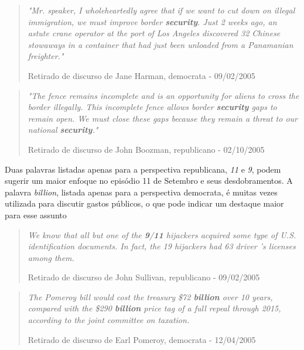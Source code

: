 \begin{quote}
\emph{"Mr. speaker, I wholeheartedly agree that if we want to cut down on illegal immigration, we must improve border \textbf{security}. Just 2 weeks ago, an astute crane operator at the port of Los Angeles discovered 32 Chinese stowaways in a container that had just been unloaded from a Panamanian freighter."} 

{\small Retirado de discurso de Jane Harman, democrata - 09/02/2005 }

\end{quote}

\begin{quote}
\emph{"The fence remains incomplete and is an opportunity for aliens to cross the border illegally. This incomplete fence allows border \textbf{security} gaps to remain open.  We must close these gaps because they remain a threat to our national \textbf{security}."}

{\small Retirado de discurso de John Boozman, republicano - 02/10/2005}

\end{quote}

Duas palavras listadas apenas para a perspectiva republicana, \emph{11} e \emph{9}, podem sugerir um maior enfoque no episódio 11 de Setembro e seus desdobramentos. A palavra \emph{billion}, listada apenas para a perspectiva democrata, é muitas vezes utilizada para discutir gastos públicos, o que pode indicar um destaque maior para esse assunto

\begin{quote}
\emph{We know that all but one of the \textbf{9}/\textbf{11} hijackers acquired some type of U.S. identification documents. In fact, the 19 hijackers had 63 driver 's licenses among them.}

{\small Retirado de discurso de John Sullivan, republicano - 09/02/2005} 
\end{quote}

\begin{quote}
\emph{The Pomeroy bill would cost the treasury \$72 \textbf{billion} over 10 years, compared with the \$290 \textbf{billion} price tag of a full repeal through 2015, according to the joint committee on taxation.}

{\small Retirado de discurso de Earl Pomeroy, democrata - 12/04/2005}
\end{quote}


